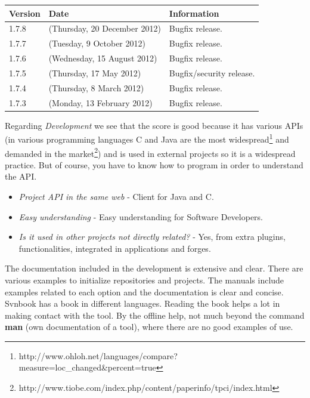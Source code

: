 \documentclass[11pt]{scrartcl}
\begin{document}
\begin{itemize}
\begin{itemize}
            \begin{table}[H]
            \centering
            \begin{tabular}{p{1.5cm} p{5.25cm} p{4cm}}
                \hline {\bf Version} & {\bf Date} & {\bf Information}\\
                \hline 1.7.8 & (Thursday, 20 December 2012) & Bugfix release.\\
                \hline 1.7.7 & (Tuesday, 9 October 2012) & Bugfix release.\\
                \hline 1.7.6 & (Wednesday, 15 August 2012) & Bugfix release.\\
                \hline 1.7.5 & (Thursday, 17 May 2012) & Bugfix/security release.\\
                \hline 1.7.4 & (Thursday, 8 March 2012) & Bugfix release.\\
                \hline 1.7.3 & (Monday, 13 February 2012) & Bugfix release.\\
                \hline
            \end{tabular}
            \end{table}
    \end{itemize}
\end{itemize}

\par Regarding \emph{Development} we see that the score is good because it has various APIs (in various programming languages ​​C and Java are the most widespread\footnote{http://www.ohloh.net/languages/compare?measure=loc\_changed\&percent=true} and demanded in the market\footnote{http://www.tiobe.com/index.php/content/paperinfo/tpci/index.html}) and is used in external projects so it is a widespread practice. But of course, you have to know how to program in order to understand the API.

\begin{itemize}
    \item \emph{Project API in the same web} - Client for Java and C.
    \item \emph{Easy understanding} - Easy understanding for Software Developers. 
    \item \emph{Is it used in other projects not directly related?} - Yes, from extra plugins, functionalities, integrated in applications and forges.
\end{itemize}
  
\par The documentation included in the development is extensive and clear. There are various examples to initialize repositories and projects. The manuals include examples related to each option and the documentation is clear and concise. Svnbook has a book in different languages. Reading the book helps a lot in making contact with the tool. By the offline help, not much beyond the command \textbf{man} (own documentation of a tool), where there are no good examples of use.
\end{document}
